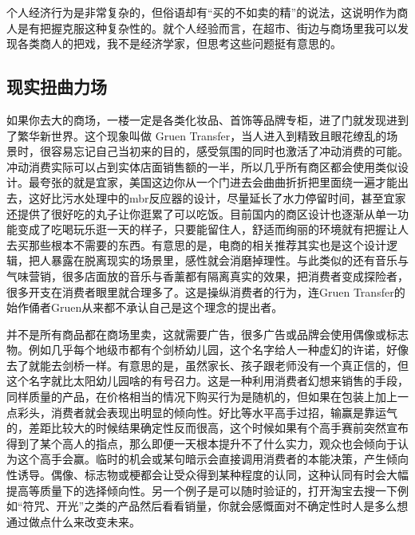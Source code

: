 \documentclass[
  letterpaper,
  DIV=11,
  numbers=noendperiod]{scrreprt}
\begin{document}
个人经济行为是非常复杂的，但俗语却有``买的不如卖的精''的说法，这说明作为商人是有把握克服这种复杂性的。就个人经验而言，在超市、街边与商场里我可以发现各类商人的把戏，我不是经济学家，但思考这些问题挺有意思的。

\subsection{现实扭曲力场}\label{ux73b0ux5b9eux626dux66f2ux529bux573a}

如果你去大的商场，一楼一定是各类化妆品、首饰等品牌专柜，进了门就发现进到了繁华新世界。这个现象叫做
Gruen
Transfer，当人进入到精致且眼花缭乱的场景时，很容易忘记自己当初来的目的，感受氛围的同时也激活了冲动消费的可能。冲动消费实际可以占到实体店面销售额的一半，所以几乎所有商区都会使用类似设计。最夸张的就是宜家，美国这边你从一个门进去会曲曲折折把里面绕一遍才能出去，这好比污水处理中的mbr反应器的设计，尽量延长了水力停留时间，甚至宜家还提供了很好吃的丸子让你逛累了可以吃饭。目前国内的商区设计也逐渐从单一功能变成了吃喝玩乐逛一天的样子，只要能留住人，舒适而绚丽的环境就有把握让人去买那些根本不需要的东西。有意思的是，电商的相关推荐其实也是这个设计逻辑，把人暴露在脱离现实的场景里，感性就会消磨掉理性。与此类似的还有音乐与气味营销，很多店面放的音乐与香薰都有隔离真实的效果，把消费者变成探险者，很多开支在消费者眼里就合理多了。这是操纵消费者的行为，连Gruen
Transfer的始作俑者Gruen从来都不承认自己是这个理念的提出者。

并不是所有商品都在商场里卖，这就需要广告，很多广告或品牌会使用偶像或标志物。例如几乎每个地级市都有个剑桥幼儿园，这个名字给人一种虚幻的许诺，好像去了就能去剑桥一样。有意思的是，虽然家长、孩子跟老师没有一个真正信的，但这个名字就比太阳幼儿园啥的有号召力。这是一种利用消费者幻想来销售的手段，同样质量的产品，在价格相当的情况下购买行为是随机的，但如果在包装上加上一点彩头，消费者就会表现出明显的倾向性。好比等水平高手过招，输赢是靠运气的，差距比较大的时候结果确定性反而很高，这个时候如果有个高手赛前突然宣布得到了某个高人的指点，那么即便一天根本提升不了什么实力，观众也会倾向于认为这个高手会赢。临时的机会或某句暗示会直接调用消费者的本能决策，产生倾向性诱导。偶像、标志物或梗都会让受众得到某种程度的认同，这种认同有时会大幅提高等质量下的选择倾向性。另一个例子是可以随时验证的，打开淘宝去搜一下例如``符咒、开光''之类的产品然后看看销量，你就会感慨面对不确定性时人是多么想通过做点什么来改变未来。
\end{document}
